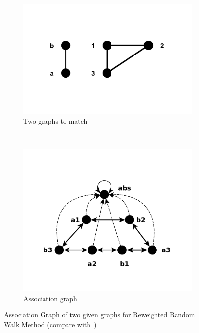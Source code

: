 \begin{figure}[h] %
	\centering
    \begin{subfigure}[b]{0.33\textwidth}
        \includegraphics[width=\textwidth]{chapter1/fig/RRWM1}
        \caption{Two graphs to match}
        \label{fig:RRWM1} 
    \end{subfigure}
    ~
    \begin{subfigure}[b]{0.33\textwidth}
        \includegraphics[width=\textwidth]{chapter1/fig/RRWM2}
        \caption{Association graph}
        \label{fig:RRWM2} 
    \end{subfigure}   
\caption{Association Graph of two given graphs for Reweighted Random Walk Method (compare with~\cite{Cho2010_RRWM})}
\end{figure}
